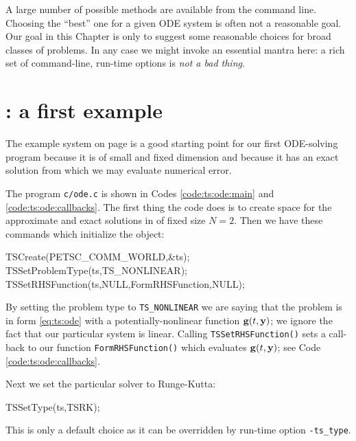 A large number of possible methods are available from the \PETSc command line.   Choosing the ``best'' one for a given ODE system is often not a reasonable goal.  Our goal in this Chapter is only to suggest some reasonable choices for broad classes of problems.  In any case we might invoke an essential \PETSc mantra here: a rich set of command-line, run-time options is \emph{not a bad thing}.


\section{\PETSc \pTS: a first example}

The example system on page \pageref{ex:ts:odeeasy} is a good starting point for our first ODE-solving program because it is of small and fixed dimension and because it has an exact solution from which we may evaluate numerical error.


The program \texttt{c/\CODELOC ode.c} is shown in Codes \ref{code:ts:ode:main} and \ref{code:ts:ode:callbacks}.  The first thing the code does is to create space for the approximate and exact solutions in \pVecs of fixed size $N=2$.  Then we have these commands which initialize the \pTS object:
\begin{code}
  TSCreate(PETSC_COMM_WORLD,&ts);
  TSSetProblemType(ts,TS_NONLINEAR);
  TSSetRHSFunction(ts,NULL,FormRHSFunction,NULL);
\end{code}
By setting the problem type to \texttt{TS\_NONLINEAR} we are saying that the problem is in form \eqref{eq:ts:ode} with a potentially-nonlinear function $\mathbf{g}(t,\mathbf{y})$; we ignore the fact that our particular system is linear.  Calling \texttt{TSSetRHSFunction()} sets a call-back to our function \texttt{FormRHSFunction()} which evaluates $\mathbf{g}(t,\mathbf{y})$; see Code \ref{code:ts:ode:callbacks}.

Next we set the particular \pTS solver to Runge-Kutta:
\begin{code}
  TSSetType(ts,TSRK);
\end{code}
This is only a default choice as it can be overridden by run-time option \texttt{-ts\_type}.

